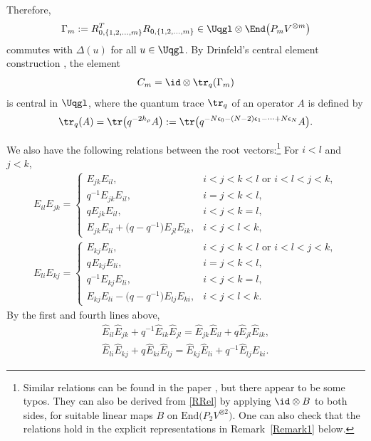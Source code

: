 Therefore,
\begin{equation*}
\Gamma_m: = R^T_{0,\{1,2,\dots,m\}} R_{0,\{1,2,\dots,m\}} \in \Uqgl \otimes \End \big(P_m V^{\otimes m}\big)
\end{equation*}
commutes with $ \Delta (u) $ for all $u\in \Uqgl$. By Drinfeld's central element construction \cite{Drin90}, the element
\begin{equation*}
C_m= \id \otimes\tr_q(\Gamma_m)
\end{equation*}
is central in $\Uqgl$, where the quantum trace $ \tr_q $ of an operator $A$ is defined by
\begin{equation*}%
\tr_q(A) = \tr\big(q^{-2h_{\rho}}A\big) := \tr \big(q^{-N\epsilon_0-(N-2)\epsilon_1 - \dots +N\epsilon_N}A\big).
\end{equation*}

We also have the following relations between the root vectors:\footnote{Similar relations can be found in the paper \cite{Xi1994}, but there appear to be some typos. They can also be derived from \eqref{RRel} by applying $\id \otimes B$ to both sides, for suitable linear maps $B$ on $\mathrm{End}\big(P_2V^{\otimes 2}\big)$. One can also check that the relations hold in the explicit representations in Remark~\ref{Remark1} below.}
For $i<l$ and $j<k$,
\begin{gather}\label{comm}
{E}_{il}{E}_{jk} =
\begin{cases}
{E}_{jk}{E}_{il}, & i< j < k < l \text{ or } i<l<j<k,\\
q^{-1} {E}_{jk}{E}_{il}, & i=j<k<l, \\
q {E}_{jk}{E}_{il}, & i<j<k=l,\\
{E}_{jk}{E}_{il} + \big(q-q^{-1}\big) {E}_{jl}{E}_{ik}, & i<j<l<k,
\end{cases}
\\
\label{comm1}
{E}_{li}{E}_{kj} =
\begin{cases}
{E}_{kj}{E}_{li}, & i< j < k < l \text{ or } i<l<j<k,\\
q^{} {E}_{kj}{E}_{li}, & i=j<k<l, \\
q^{-1} {E}_{kj}{E}_{li}, & i<j<k=l,\\
{E}_{kj}{E}_{li} - \big(q-q^{-1}\big) {E}_{lj}{E}_{ki}, & i<j<l<k.
\end{cases}
\end{gather}
By the first and fourth lines above,
\begin{gather}\label{comm2}
\hat{E}_{il}\hat{E}_{jk} + q^{-1} \hat{E}_{ik}\hat{E}_{jl} = \hat{E}_{jk}\hat{E}_{il} + q \hat{E}_{jl}\hat{E}_{ik}, \\
\hat{E}_{li}\hat{E}_{kj} + q^{} \hat{E}_{ki}\hat{E}_{lj} = \hat{E}_{kj}\hat{E}_{li} + q^{-1} \hat{E}_{lj}\hat{E}_{ki}. \label{comm3}
\end{gather}

